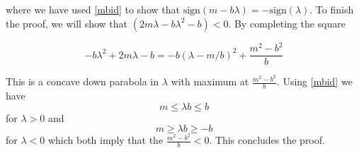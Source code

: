 \documentclass{article}
\begin{document}
where we have used \eqref{mbid} to show that $\text{sign}(m-b\lambda)= - \text{sign}(\lambda)$. To finish the proof, we will show that $(2m\lambda - b\lambda^2-b) < 0$. By completing the square

\begin{equation}
    -b\lambda^2 + 2m\lambda -b = -b(\lambda - m/b)^2 + \frac{m^2 - b^2}{b}
\end{equation}

This is a concave down parabola in $\lambda$ with maximum at $\frac{m^2 - b^2}{b}$. Using \eqref{mbid} we have 
\begin{equation}
    m \le \lambda b \le b
\end{equation}
for $\lambda > 0$ and 
\begin{equation}
    m \ge \lambda b \ge -b
\end{equation}
for $\lambda <0$ which both imply that the $\frac{m^2 - b^2}{b}<0$. This concludes the proof. 
\end{document}
